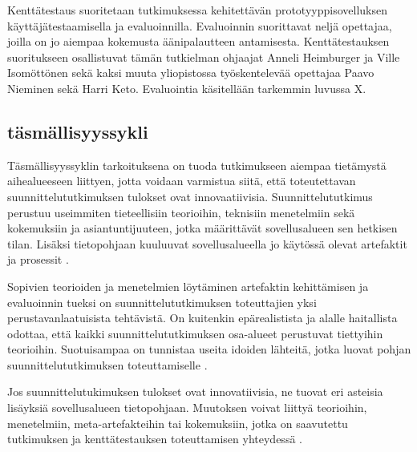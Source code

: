 \documentclass[utf8]{gradu3}
\begin{document}
Kenttätestaus suoritetaan tutkimuksessa kehitettävän prototyyppisovelluksen käyttäjätestaamisella ja evaluoinnilla. Evaluoinnin suorittavat neljä opettajaa, joilla on jo aiempaa kokemusta äänipalautteen antamisesta. Kenttätestauksen suoritukseen osallistuvat tämän tutkielman ohjaajat Anneli Heimburger ja Ville Isomöttönen sekä kaksi muuta yliopistossa työskentelevää opettajaa Paavo Nieminen sekä Harri Keto. Evaluointia käsitellään tarkemmin luvussa X. 

\subsection{täsmällisyyssykli}

Täsmällisyyssyklin tarkoituksena on tuoda tutkimukseen aiempaa tietämystä aihealueeseen liittyen, jotta voidaan varmistua siitä, että toteutettavan suunnittelututkimuksen tulokset ovat innovaatiivisia. Suunnittelututkimus perustuu useimmiten tieteellisiin teorioihin, teknisiin menetelmiin sekä kokemuksiin ja asiantuntijuuteen, jotka määrittävät sovellusalueen sen hetkisen tilan. Lisäksi tietopohjaan kuuluuvat sovellusalueella jo käytössä olevat artefaktit ja prosessit \parencite[][]{cycles}.

Sopivien teorioiden ja menetelmien löytäminen artefaktin kehittämisen ja evaluoinnin tueksi on suunnittelututkimuksen toteuttajien yksi perustavanlaatuisista tehtävistä. On kuitenkin epärealistista ja alalle haitallista odottaa, että kaikki suunnittelututkimuksen osa-alueet perustuvat tiettyihin teorioihin. Suotuisampaa on tunnistaa useita idoiden lähteitä, jotka luovat pohjan suunnittelututkimuksen toteuttamiselle \parencite[][]{cycles}.

Jos suunnittelutukimuksen tulokset ovat innovatiivisia, ne tuovat eri asteisia lisäyksiä sovellusalueen tietopohjaan. Muutoksen voivat liittyä teorioihin, menetelmiin, meta-artefakteihin tai kokemuksiin, jotka on saavutettu tutkimuksen ja kenttätestauksen toteuttamisen yhteydessä \parencite[][]{cycles}.
\end{document}
